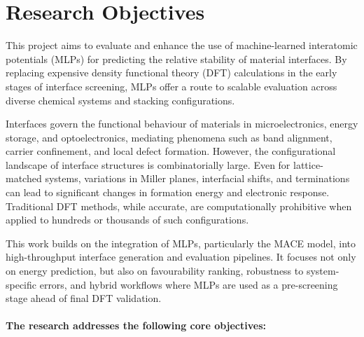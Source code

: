 \section{Research Objectives} \label{section:research_objectives} 

This project aims to evaluate and enhance the use of machine-learned interatomic potentials (MLPs) for predicting the relative stability of material interfaces. By replacing expensive density functional theory (DFT) calculations in the early stages of interface screening, MLPs offer a route to scalable evaluation across diverse chemical systems and stacking configurations.

Interfaces govern the functional behaviour of materials in microelectronics, energy storage, and optoelectronics, mediating phenomena such as band alignment, carrier confinement, and local defect formation. However, the configurational landscape of interface structures is combinatorially large. Even for lattice-matched systems, variations in Miller planes, interfacial shifts, and terminations can lead to significant changes in formation energy and electronic response. Traditional DFT methods, while accurate, are computationally prohibitive when applied to hundreds or thousands of such configurations.

This work builds on the integration of MLPs, particularly the MACE model, into high-throughput interface generation and evaluation pipelines. It focuses not only on energy prediction, but also on favourability ranking, robustness to system-specific errors, and hybrid workflows where MLPs are used as a pre-screening stage ahead of final DFT validation.

\paragraph{The research addresses the following core objectives:} 

